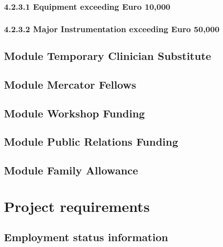 \documentclass[11pt]{article}
\begin{document}
\vspace{-1ex}\subsubsection*{4.2.3.1 Equipment exceeding Euro 10,000 }
\vspace{-1ex}\subsubsection*{4.2.3.2 Major Instrumentation exceeding Euro 50,000 }

\vspace{-1ex}\subsection{Module Temporary Clinician Substitute }

\vspace{-1ex}\subsection{Module Mercator Fellows }

\vspace{-1ex}\subsection{Module Workshop Funding}

\vspace{-1ex}\subsection{Module Public Relations Funding}

\vspace{-1ex}\subsection{Module Family Allowance }

\vspace{-1ex}\section{Project requirements}

\vspace{-1ex}\subsection{Employment status information}
\end{document}
